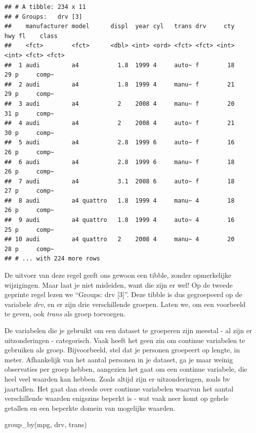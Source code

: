 \documentclass[]{tufte-book}
\newenvironment{Shaded}{}{}
\newcommand{\FunctionTok}[1]{\textcolor[rgb]{0.02,0.16,0.49}{#1}}
\newcommand{\NormalTok}[1]{#1}
\begin{document}
\begin{verbatim}
## # A tibble: 234 x 11
## # Groups:   drv [3]
##    manufacturer model      displ  year cyl   trans drv     cty   hwy fl    class
##    <fct>        <fct>      <dbl> <int> <ord> <fct> <fct> <int> <int> <fct> <fct>
##  1 audi         a4           1.8  1999 4     auto~ f        18    29 p     comp~
##  2 audi         a4           1.8  1999 4     manu~ f        21    29 p     comp~
##  3 audi         a4           2    2008 4     manu~ f        20    31 p     comp~
##  4 audi         a4           2    2008 4     auto~ f        21    30 p     comp~
##  5 audi         a4           2.8  1999 6     auto~ f        16    26 p     comp~
##  6 audi         a4           2.8  1999 6     manu~ f        18    26 p     comp~
##  7 audi         a4           3.1  2008 6     auto~ f        18    27 p     comp~
##  8 audi         a4 quattro   1.8  1999 4     manu~ 4        18    26 p     comp~
##  9 audi         a4 quattro   1.8  1999 4     auto~ 4        16    25 p     comp~
## 10 audi         a4 quattro   2    2008 4     manu~ 4        20    28 p     comp~
## # ... with 224 more rows
\end{verbatim}

De uitvoer van deze regel geeft ons gewoon een tibble, zonder opmerkelijke wijzigingen. Maar laat je niet misleiden, want die zijn er wel! Op de tweede geprinte regel lezen we ``Groups: drv {[}3{]}''. Deze tibble is dus gegroepeerd op de variabele \emph{drv}, en er zijn drie verschillende groepen. Laten we, om een voorbeeld te geven, ook \emph{trans} als groep toevoegen.

De variabelen die je gebruikt om een dataset te groeperen zijn meestal - al zijn er uitzonderingen - categorisch. Vaak heeft het geen zin om continue variabelen te gebruiken als groep. Bijvoorbeeld, stel dat je personen groepeert op lengte, in meter. Afhankelijk van het aantal personen in je dataset, ga je maar weinig observaties per groep hebben, aangezien het gaat om een continue variabele, die heel veel waarden kan hebben. Zoals altijd zijn er uitzonderingen, zoals bv jaartallen. Het gaat dan steeds over continue variabelen waarvan het aantal verschillende waarden enigszins beperkt is - wat vaak neer komt op gehele getallen en een beperkte domein van mogelijke waarden.

\begin{Shaded}
\begin{Highlighting}[]
\FunctionTok{group\_by}\NormalTok{(mpg, drv, trans)}
\end{Highlighting}
\end{Shaded}
\end{document}
